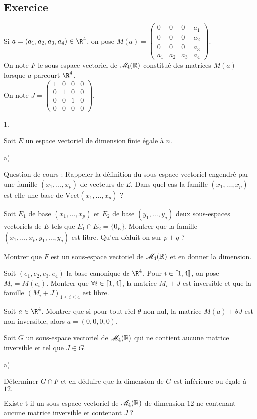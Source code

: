 \documentclass[11pt]{article}%
\begin{document}
\subsection*{Exercice}
\noindent
Si $a=(a_1,a_2,a_3,a_4)\in\R^4$, on pose $M(a)=\begin{pmatrix} 
0&0&0&a_1\\ 0&0&0&a_2\\ 0&0&0&a_3\\a_1&a_2&a_3&a_4\end{pmatrix}$. \\
On note $F$ le sous-espace vectoriel de $\mathscr{M}_{4}(\mathbb{R})$ constitué des 
matrices $M(a)$ lorsque $a $ parcourt $\R^4$. \\
On note $J=\begin{pmatrix} 1&0&0&0\\ 0&1&0&0\\ 
0&0&1&0\\0&0&0&0\end{pmatrix}$.
\begin{noliste}{1.}
\item
Soit $E$ un espace vectoriel de dimension finie égale à $n$.
\begin{noliste}{a)}
\item
\textsf{Question de cours :} Rappeler la définition du sous-espace 
vectoriel engendré par une famille $(x_1,\ldots,x_p)$ de vecteurs de 
$E$. Dans quel cas la famille $(x_1,\ldots,x_p)$ est-elle une base de 
$\text{Vect}(x_1,\ldots,x_p)$ ?
\item
Soit $E_1$ de base $(x_1,\ldots,x_p)$ et $E_2$ de base 
$(y_1,\ldots,y_q)$ deux sous-espaces vectoriels de $E$ tels que $E_1\cap 
E_2=\{0_E\}$. Montrer que la famille $(x_1,\ldots,x_p,y_1,\ldots,y_q)$ 
est libre. Qu'en déduit-on sur $p+q$ ?
\end{noliste}
\item
Montrer que $F$ est un sous-espace vectoriel de $\mathscr{M}_{4}(\mathbb{R})$ et en 
donner la dimension.
\item
Soit $(e_1,e_2,e_3,e_4)$ la base canonique de $\R^4$. Pour 
$i\in\llbracket 1,4\rrbracket$, on pose $M_i=M(e_i)$. Montrer que $\forall 
i\in\llbracket 1,4\rrbracket$, la matrice $M_i+J$ est inversible et que la famille 
$(M_i+J)_{1\le i\le 4}$ est libre.
\item
Soit $a\in\R^4$. Montrer que si pour tout réel $\theta$ non nul, la 
matrice $M(a)+\theta J$ est non inversible, alors $a=(0,0,0,0)$.
\item
Soit $G$ un sous-espace vectoriel de $\mathscr{M}_{4}(\mathbb{R})$ qui ne contient 
aucune matrice inversible et tel que $J\in G$.
\begin{noliste}{a)}
\item
Déterminer $G\cap F$ et en déduire que la dimension de $G$ est 
inférieure ou égale à $12.$
\item
Existe-t-il un sous-espace vectoriel de $\mathscr{M}_{4}(\mathbb{R})$ de dimension 
$12$ ne contenant aucune matrice inversible et contenant $J$ ?
\end{noliste}
\end{noliste}
\end{document}
